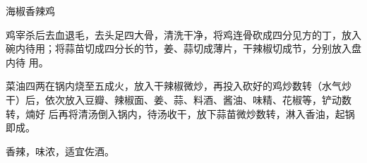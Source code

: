 \begin{recipe}[钢铁仔鸡]{海椒香辣鸡}

\ingredients


\preparation

\step 鸡宰杀后去血退毛，去头足四大骨，清洗干净，将鸡连骨砍成四分见方的丁，放入
碗内待用；将蒜苗切成四分长的节，姜、蒜切成薄片，干辣椒切成节，分别放入盘内待
用。

\step 菜油四两在锅内烧至五成火，放入干辣椒微炒，再投入砍好的鸡炒数转（水气炒
干）后，依次放入豆瓣、辣椒面、姜、蒜、料酒、酱油、味精、花椒等，铲动数转，煵好
后再将清汤倒入锅内，待汤收干，放下蒜苗微炒数转，淋入香油，起锅即成。

\features

香辣，味浓，适宜佐酒。

\end{recipe}

